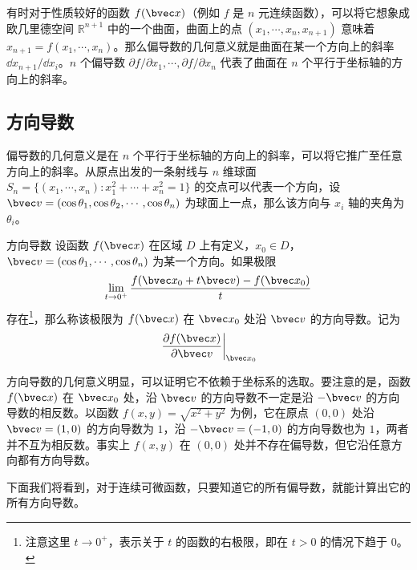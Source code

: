 有时对于性质较好的函数 $f(\bvec x)$（例如 $f$ 是 $n$ 元连续函数），可以将它想象成欧几里德空间 $\mathbb{R}^{n+1}$ 中的一个曲面，曲面上的点 $(x_1,\cdots,x_n,x_{n+1})$ 意味着 $x_{n+1}=f(x_1,\cdots,x_n)$。那么偏导数的几何意义就是曲面在某一个方向上的斜率 $\dd x_{n+1}/\dd x_i$。$n$ 个偏导数 $\partial f/\partial x_1,\cdots,\partial f/\partial x_n$ 代表了曲面在 $n$ 个平行于坐标轴的方向上的斜率。

\subsection{方向导数}
偏导数的几何意义是在 $n$ 个平行于坐标轴的方向上的斜率，可以将它推广至任意方向上的斜率。从原点出发的一条射线与 $n$ 维球面 $S_n=\{(x_1,\cdots,x_n):x_1^2+\cdots+x_n^2=1\}$ 的交点可以代表一个方向，设 $\bvec v=(\cos \theta_1,\cos\theta_2,\cdots,\cos\theta_n)$ 为球面上一点，那么该方向与 $x_i$ 轴的夹角为 $\theta_i$。
\begin{definition}{方向导数}
设函数 $f(\bvec x)$ 在区域 $D$ 上有定义，$x_0\in D$，$\bvec v=(\cos \theta_1,\cdots,\cos\theta_n)$ 为某一个方向。如果极限
\begin{equation}
\lim\limits_{t\rightarrow 0^+}\frac{f(\bvec x_0+t\bvec v)-f(\bvec x_0)}{t}
\end{equation}
存在\footnote{注意这里 $t\rightarrow 0^+$，表示关于 $t$ 的函数的右极限，即在 $t>0$ 的情况下趋于 $0$。}，那么称该极限为 $f(\bvec x)$ 在 $\bvec x_0$ 处沿 $\bvec v$ 的方向导数。记为
\begin{equation}
\left.\frac{\partial f(\bvec x)}{\partial \bvec v}\right|_{\bvec x_0}
\end{equation}
\end{definition}

方向导数的几何意义明显，可以证明它不依赖于坐标系的选取。要注意的是，函数 $f(\bvec x)$ 在 $\bvec x_0$ 处，沿 $\bvec v$ 的方向导数不一定是沿 $-\bvec v$ 的方向导数的相反数。以函数 $f(x,y)=\sqrt{x^2+y^2}$ 为例，它在原点 $(0,0)$ 处沿 $\bvec v=(1,0)$ 的方向导数为 $1$，沿 $-\bvec v=(-1,0)$ 的方向导数也为 $1$，两者并不互为相反数。事实上 $f(x,y)$ 在 $(0,0)$ 处并不存在偏导数，但它沿任意方向都有方向导数。

下面我们将看到，对于连续可微函数，只要知道它的所有偏导数，就能计算出它的所有方向导数。
